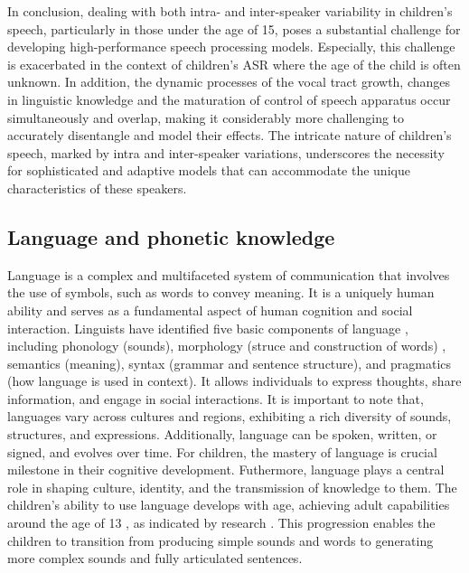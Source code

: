 In conclusion, dealing with both intra- and inter-speaker variability in children's speech, particularly in those under the age of 15, poses a substantial challenge for developing high-performance speech processing models. Especially, this challenge is exacerbated in the context of children's ASR where the age of the child is often unknown. In addition, the dynamic processes of the vocal tract growth, changes in linguistic knowledge and the maturation of control of speech apparatus occur simultaneously and overlap, making it considerably more challenging to accurately disentangle and model their effects. The intricate nature of children's speech, marked by intra and inter-speaker variations, underscores the necessity for sophisticated and adaptive models that can accommodate the unique characteristics of these speakers.



\subsection{Language and phonetic knowledge} %
\label{subsection:mispron}
Language is a complex and multifaceted system of communication that involves the use of symbols, such as words to convey meaning. It is a uniquely human ability and serves as a fundamental aspect of human cognition and social interaction. Linguists have identified five basic components of language \cite{moats2000speech}, including phonology (sounds), morphology (struce and construction of words) , semantics (meaning), syntax (grammar and sentence structure), and pragmatics (how language is used in context). It allows individuals to express thoughts, share information, and engage in social interactions. It is important to note that, languages vary across cultures and regions, exhibiting a rich diversity of sounds, structures, and expressions. Additionally, language can be spoken, written, or signed, and evolves over time. For children, the mastery of language is crucial milestone in their cognitive development. Futhermore, language plays a central role in shaping culture, identity, and the transmission of knowledge to them. The children's ability to use language develops with age, achieving adult capabilities around the age of 13 , as indicated by research \cite{Acoustic_change_children}. This progression enables the children to transition from producing simple sounds and words to generating more complex sounds and fully articulated sentences.

